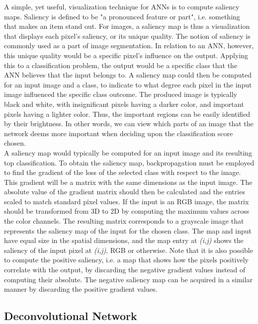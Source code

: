 A simple, yet useful, visualization technique for ANNs is to compute saliency maps. Saliency is defined to be "a pronounced feature or part", i.e. something that makes an item stand out. For images, a saliency map is thus a visualization that displays each pixel's saliency, or its unique quality. The notion of saliency is commonly used as a part of image segmentation. In relation to an ANN, however, this unique quality would be a specific pixel's influence on the output. Applying this to a classification problem, the output would be a specific class that the ANN believes that the input belongs to. A saliency map could then be computed for an input image and a class, to indicate to what degree each pixel in the input image influenced the specific class outcome. The produced image is typically black and white, with insignificant pixels having a darker color, and important pixels having a lighter color. Thus, the important regions can be easily identified by their brightness. In other words, we can view which parts of an image that the network deems more important when deciding upon the classification score chosen. \\

\noindent A saliency map would typically be computed for an input image and its resulting top classification. To obtain the saliency map, backpropagation must be employed to find the gradient of the loss of the selected class with respect to the image. This gradient will be a matrix with the same dimensions as the input image. The absolute value of the gradient matrix should then be calculated and the entries scaled to match standard pixel values. If the input is an RGB image, the matrix should be transformed from 3D to 2D by computing the maximum values across the color channels. The resulting matrix corresponds to a grayscale image that represents the saliency map of the input for the chosen class. The map and input have equal size in the spatial dimensions, and the map entry at \textit{(i,j)} shows the saliency of the input pixel at \textit{(i,j)}, RGB or otherwise. Note that it is also possible to compute the positive saliency, i.e. a map that shows how the pixels positively correlate with the output, by discarding the negative gradient values instead of computing their absolute. The negative saliency map can be acquired in a similar manner by discarding the positive gradient values.

\subsection{Deconvolutional Network} \label{deconv-net}

